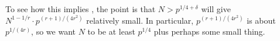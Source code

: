 \documentclass[../notes.tex]{subfiles}
\begin{document}
\begin{remark}
	To see how this implies , the point is that $N>p^{1/4+\delta}$ will give $N^{1-1/r}\cdot p^{(r+1)/\left(4r^2\right)}$ relatively small. In particular, $p^{(r+1)/\left(4r^2\right)}$ is about $p^{1/(4r)}$, so we want $N$ to be at least $p^{1/4}$ plus perhaps some small thing.
\end{remark}
\end{document}
